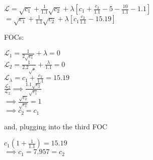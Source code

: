\documentclass[11pt]{SelfArxOneColBMN}
\begin{document}
\begin{solution}
  \begin{center}
    $\mathcal{L} = \sqrt{c_1} + \frac{1}{1.1}\sqrt{c_2} + \lambda[c_1 + \frac{c_2}{1.1} - 5 - \frac{10}{1.1} - 1.1]$\\
    $= \sqrt{c_1} + \frac{1}{1.1}\sqrt{c_2} + \lambda[c_1 \frac{c_2}{1.1} - 15.19]$\\
  \end{center}
    FOCs:\\
  \begin{center}
    $\mathcal{L}_1 = \frac{1}{2\sqrt{c_1}} + \lambda = 0$\\
    $\mathcal{L}_2 = \frac{1}{2.2\sqrt{_2}} + \frac{\lambda}{1.1} = 0$\\
    $\mathcal{L}_\lambda = c_1 +\frac{c_2}{1.1} = 15.19$\\
    $\frac{\mathcal{L}_2}{\mathcal{L}_2} \implies \frac{1.1\sqrt{c_2}}{\sqrt{c_1}}$\\
    $\implies \frac{\sqrt{c_2}}{\sqrt{c_1}} = 1$\\
    $\implies c_2 = c_1$
  \end{center}
  and, plugging into the third FOC\\
  \begin{center}  
    $c_1(1 + \frac{1}{1.1}) = 15.19$\\
    $\implies c_1 = 7.957 = c_2$
  \end{center}
\end{solution}
\end{document}
